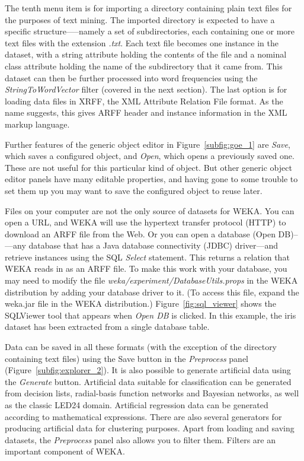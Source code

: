 The tenth menu item is for importing a directory containing plain text
files for the purposes of text mining. The imported directory is
expected to have a specific structure—--namely a set of
subdirectories, each containing one or more text files with the
extension \textit{.txt}. Each text file becomes one instance in the
dataset, with a string attribute holding the contents of the file and
a nominal class attribute holding the name of the subdirectory that it
came from. This dataset can then be further processed into word
frequencies using the \textit{StringToWordVector} filter (covered in
the next section). The last option is for loading data files in XRFF,
the XML Attribute Relation File format. As the name suggests, this
gives ARFF header and instance information in the XML markup language.

Further features of the generic object editor in Figure~\ref{subfig:goe_1} are
\textit{Save}, which saves a configured object, and \textit{Open},
which opens a previously saved one. These are not useful for this
particular kind of object. But other generic object editor panels have
many editable properties, and having gone to some trouble to set them
up you may want to save the configured object to reuse later.

Files on your computer are not the only source of datasets for
WEKA. You can open a URL, and WEKA will use the hypertext transfer
protocol (HTTP) to download an ARFF file from the Web. Or you can open
a database (Open DB)--—any database that has a Java database
connectivity (JDBC) driver—and retrieve instances using the SQL
\textit{Select} statement. This returns a relation that WEKA reads in
as an ARFF file. To make this work with your database, you may need to
modify the file \textit{weka/experiment/DatabaseUtils.props} in the
WEKA distribution by adding your database driver to it. (To access
this file, expand the weka.jar file in the WEKA distribution.)
Figure~\ref{fig:sql_viewer} shows the SQLViewer tool that appears when
\textit{Open DB} is clicked. In this example, the iris dataset has been
extracted from a single database table.

Data can be saved in all these formats (with the exception of the
directory containing text files) using the Save button in the
\textit{Preprocess} panel (Figure~\ref{subfig:explorer_2}). It is also
possible to generate artificial data using the \textit{Generate}
button. Artificial data suitable for classification can be generated
from decision lists, radial-basis function networks and Bayesian
networks, as well as the classic LED24 domain. Artificial regression
data can be generated according to mathematical expressions. There are
also several generators for producing artificial data for clustering
purposes. Apart from loading and saving datasets, the
\textit{Preprocess} panel also allows you to filter them. Filters are
an important component of WEKA.

